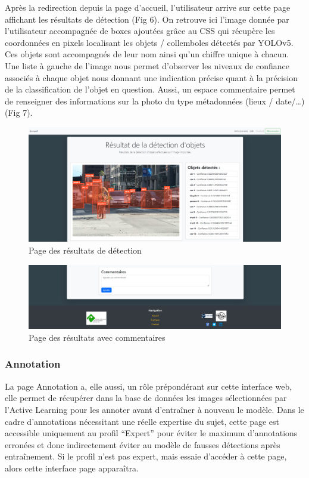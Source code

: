 \documentclass[
  10pt,
]{article}
\begin{document}
Après la redirection depuis la page d'accueil, l'utilisateur arrive sur
cette page affichant les résultats de détection (Fig 6). On retrouve ici
l'image donnée par l'utilisateur accompagnée de boxes ajoutées grâce au
CSS qui récupère les coordonnées en pixels localisant les objets /
collemboles détectés par YOLOv5. Ces objets sont accompagnés de leur nom
ainsi qu'un chiffre unique à chacun. Une liste à gauche de l'image nous
permet d'observer les niveaux de confiance associés à chaque objet nous
donnant une indication précise quant à la précision de la classification
de l'objet en question. Aussi, un espace commentaire permet de
renseigner des informations sur la photo du type métadonnées (lieux /
date/\ldots) (Fig 7).

\begin{figure}[htbp]
\centering
\includegraphics[width=\textwidth]{img_rmd/fig6.png}
\caption{Page des résultats de détection}
\end{figure}

\begin{figure}[htbp]
\centering
\includegraphics[width=\textwidth]{img_rmd/fig7.png}
\caption{Page des résultats avec commentaires}
\end{figure}

\newpage

\subsubsection{Annotation}\label{annotation}

La page Annotation a, elle aussi, un rôle prépondérant sur cette
interface web, elle permet de récupérer dans la base de données les
images sélectionnées par l'Active Learning pour les annoter avant
d'entraîner à nouveau le modèle. Dans le cadre d'annotations nécessitant
une réelle expertise du sujet, cette page est accessible uniquement au
profil ``Expert'' pour éviter le maximum d'annotations erronées et donc
indirectement éviter au modèle de fausses détections après entraînement.
Si le profil n'est pas expert, mais essaie d'accéder à cette page, alors
cette interface page apparaîtra.
\end{document}
